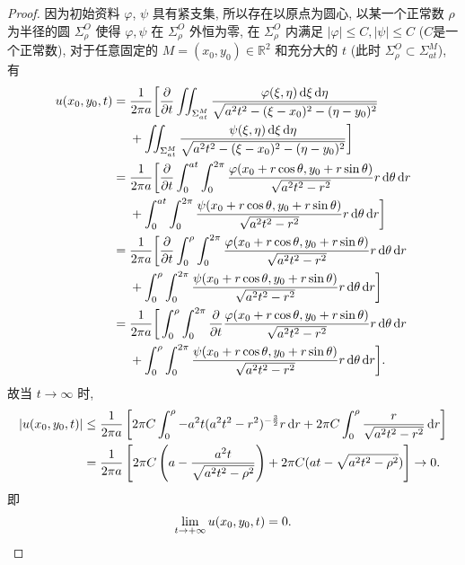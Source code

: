 \begin{proof}
  因为初始资料 $\varphi$, $\psi$ 具有紧支集, 所以存在以原点为圆心,
  以某一个正常数 $\rho$ 为半径的圆 $\Sigma_{\rho}^O$ 
  使得 $\varphi,\psi$ 在 $\Sigma_{\rho}^O$ 外恒为零,
  在 $\Sigma_{\rho}^O$ 内满足 $|\varphi|\leq C,|\psi|\leq C$ ($C$是一个正常数),
  对于任意固定的 $M=(x_0,y_0)\in\mathbb{R}^2$
  和充分大的 $t$ (此时 $\Sigma_{\rho}^O\subset\Sigma_{at}^M$), 有
  \begin{align*}
    u(x_0,y_0,t) = {} 
    & \frac{1}{2\pi a}\biggl[\frac{\partial}{\partial t}
      \iint_{\Sigma_{at}^M}
      \frac{\varphi(\xi,\eta)\diff\xi\diff\eta}{\sqrt{a^2t^2-(\xi-x_0)^2-(\eta-y_0)^2}} \\
    & + \iint_{\Sigma_{at}^M}\frac{\psi(\xi,\eta)\diff\xi\diff\eta}
      {\sqrt{a^2t^2-(\xi-x_0)^2-(\eta-y_0)^2}}\biggr] \\
={} & \frac{1}{2\pi a}\bigg[\frac{\partial}{\partial t}\int_0^{at}\int_0^{2\pi}
      \frac{\varphi(x_0+r\cos\theta,y_0+r\sin\theta)}{\sqrt{a^2t^2-r^2}}r\diff\theta\diff r \\
    & +\int_0^{at}\int_0^{2\pi}\frac{\psi(x_0+r\cos\theta,y_0+r\sin\theta)}
      {\sqrt{a^2t^2-r^2}}r\diff\theta\diff r\bigg] \\
={} & \frac{1}{2\pi a}\bigg[\frac{\partial}{\partial t}
      \int_0^{\rho}\int_0^{2\pi}\frac{\varphi(x_0+r\cos\theta,y_0+r\sin\theta)}
      {\sqrt{a^2t^2-r^2}}r\diff\theta\diff r \\
    & + \int_0^{\rho}\int_0^{2\pi}\frac{\psi(x_0+r\cos\theta,y_0+r\sin\theta)}{\sqrt{a^2t^2-r^2}}r\diff\theta\diff r\bigg] \\
={} & \frac{1}{2\pi a}\bigg[\int_0^{\rho}\int_0^{2\pi}\frac{\partial}{\partial t}
      \frac{\varphi(x_0+r\cos\theta,y_0+r\sin\theta)}{\sqrt{a^2t^2-r^2}}r\diff\theta\diff r \\
    & + \int_0^{\rho}\int_0^{2\pi}\frac{\psi(x_0+r\cos\theta,y_0+r\sin\theta)}
      {\sqrt{a^2t^2-r^2}}r\diff\theta\diff r\bigg].
  \end{align*}
  故当 $t\to\infty$ 时,
  \[\begin{split}
  |u(x_0,y_0,t)|&\leq \frac{1}{2\pi a}\left[2\pi C\int_0^{\rho}-a^2t(a^2t^2-r^2)^{-\frac{3}{2}}r\mathop{}\!\mathrm{d} r+2\pi C\int_0^{\rho}\frac{r}{\sqrt{a^2t^2-r^2}}\mathop{}\!\mathrm{d} r\right]\\
  &=\frac{1}{2\pi a}\left[2\pi C\left(a-\frac{a^2t}{\sqrt{a^2t^2-\rho^2}}\right)+2\pi C(at-\sqrt{a^2t^2-\rho^2})\right]\to 0.
  \end{split}\]
  即
  \[\lim_{t\to+\infty}u(x_0,y_0,t) = 0.\qedhere\]
\end{proof}


